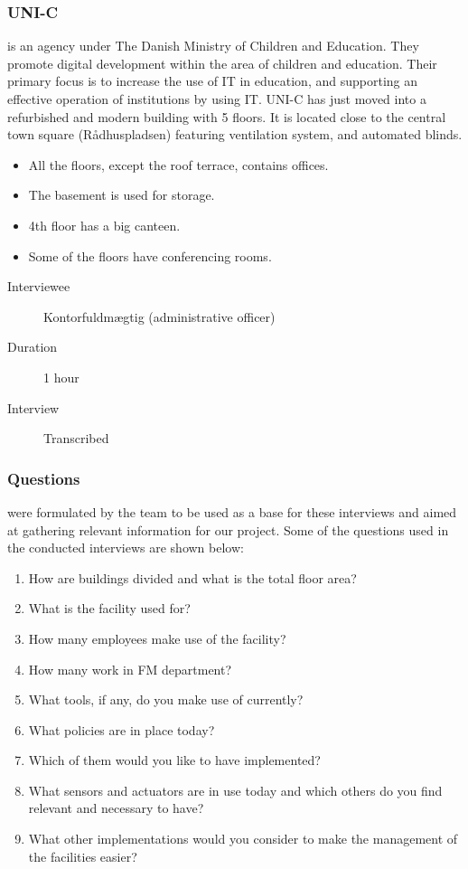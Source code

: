 \subsubsection{UNI-C} is an agency under The Danish Ministry of Children and Education. They promote digital development within the area of children and education. Their primary focus is to increase the use of IT in education, and supporting an effective operation of institutions by using IT. UNI-C has just moved into a refurbished and modern building with 5 floors. It is located close to the central town square (R\aa dhuspladsen) featuring ventilation system, and automated blinds.
\begin{itemize}
	\item All the floors, except the roof terrace, contains offices.
	\item The basement is used for storage.
	\item 4th floor has a big canteen.
	\item Some of the floors have conferencing rooms.
\end{itemize}
\begin{description}
	\item[Interviewee] Kontorfuldmægtig (administrative officer)
	\item[Duration] 1 hour
	\item[Interview] Transcribed
\end{description}

\subsubsection{Questions} were formulated by the team to be used as a base for these interviews and aimed at gathering relevant information for our project. Some of the questions used in the conducted interviews are shown below:
\begin{enumerate}
	\item How are buildings divided and what is the total floor area?
	\item What is the facility used for? 
	\item How many employees make use of the facility?
	\item How many work in FM department?
	\item What tools, if any, do you make use of currently?
	\item What policies are in place today?
	\item Which of them would you like to have implemented?
	\item What sensors and actuators are in use today and which others do you find relevant and necessary to have?
	\item What other implementations would you consider to make the management of the facilities easier?
\end{enumerate}

